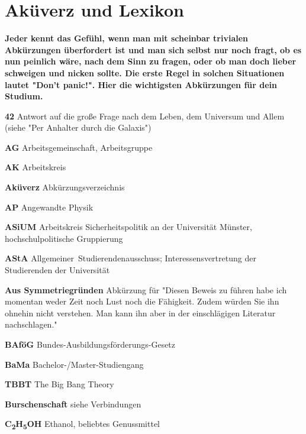 
\newcommand{\fibelabk}[2]{\textbf{#1} #2}

\section{Aküverz und Lexikon}
\vspace{-2em}
\enlargethispage{\baselineskip}
\begin{multicols}{2}
\textbf{Jeder kennt das Gefühl, wenn man mit scheinbar trivialen Abkürzungen überfordert ist und man sich selbst nur noch fragt, ob es nun peinlich wäre, nach dem Sinn zu fragen, oder ob man doch lieber schweigen und nicken sollte. Die erste Regel in solchen Situationen lautet "Don't panic!". Hier die wichtigsten Abkürzungen für dein Studium.}

\setlength{\parskip}{0.03cm}

\fibelabk{42}{Antwort auf die große Frage nach dem Leben, dem Universum und Allem (siehe "Per Anhalter durch die Galaxis")}

\fibelabk{AG}{Arbeitsgemeinschaft, Arbeitsgruppe}

\fibelabk{AK}{Arbeitskreis}

\fibelabk{Aküverz}{Abkürzungsverzeichnis}

\fibelabk{AP}{Angewandte Physik}

\fibelabk{ASiUM}{Arbeitskreis Sicherheitspolitik an der Universität Münster, hochschulpolitische Gruppierung}

\fibelabk{AStA}{Allgemeiner~Studierendenausschuss; Interessensvertretung der Studierenden der Universität}

\fibelabk{Aus Symmetriegründen}{Abkürzung für "Diesen Beweis zu führen habe ich momentan weder Zeit noch Lust noch die Fähigkeit. Zudem würden Sie ihn ohnehin nicht verstehen. Man kann ihn aber in der einschlägigen Literatur nachschlagen."}

\fibelabk{BAföG}{Bundes-Ausbildungsförderungs-Gesetz}

\fibelabk{BaMa}{Bachelor-/Master-Studiengang}

\fibelabk{TBBT}{The Big Bang Theory}

\fibelabk{Burschenschaft}{siehe Verbindungen}

\fibelabk{C\textsubscript{2}H\textsubscript{5}OH}{Ethanol, beliebtes Genussmittel}


\end{multicols}
